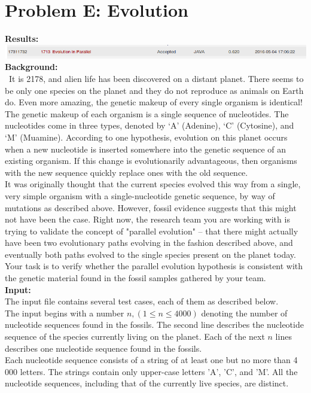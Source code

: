 \documentclass[12pt]{article}
\begin{document}

\section{Problem E: Evolution}
\noindent \textbf{Results:} \\

\includegraphics[width=\textwidth]{ProblemE} \\

\noindent \textbf{Background:} \\
~\indent  It is 2178, and alien life has been discovered on a distant planet. There seems to be only one species on
the planet and they do not reproduce as animals on Earth do. Even more amazing, the genetic makeup of every single
organism is identical! \\
\indent The genetic makeup of each organism is a single sequence of nucleotides. The nucleotides come in
three types, denoted by `A' (Adenine), `C' (Cytosine), and `M' (Muamine). According to one hypothesis,
evolution on this planet occurs when a new nucleotide is inserted somewhere into the genetic sequence
of an existing organism. If this change is evolutionarily advantageous, then organisms with the new
sequence quickly replace ones with the old sequence. \\
\indent It was originally thought that the current species evolved this way from a single, very simple
organism with a single-nucleotide genetic sequence, by way of mutations as described above. However,
fossil evidence suggests that this might not have been the case. Right now, the research team you are
working with is trying to validate the concept of "parallel evolution" -- that there might actually have
been two evolutionary paths evolving in the fashion described above, and eventually both paths evolved
to the single species present on the planet today. Your task is to verify whether the parallel evolution
hypothesis is consistent with the genetic material found in the fossil samples gathered by your team. \\

\noindent \textbf{Input:} \\
The input file contains several test cases, each of them as described below. \\
\indent The input begins with a number $n, (1 \leq n \leq 4000)$ denoting the number of nucleotide sequences
found in the fossils. The second line describes the nucleotide sequence of the species currently living
on the planet. Each of the next $n$ lines describes one nucleotide sequence found in the fossils. \\
\indent Each nucleotide sequence consists of a string of at least one but no more than 4 000 letters. The
strings contain only upper-case letters 'A', 'C', and 'M'. All the nucleotide sequences, including that of
the currently live species, are distinct. \\
\end{document}
